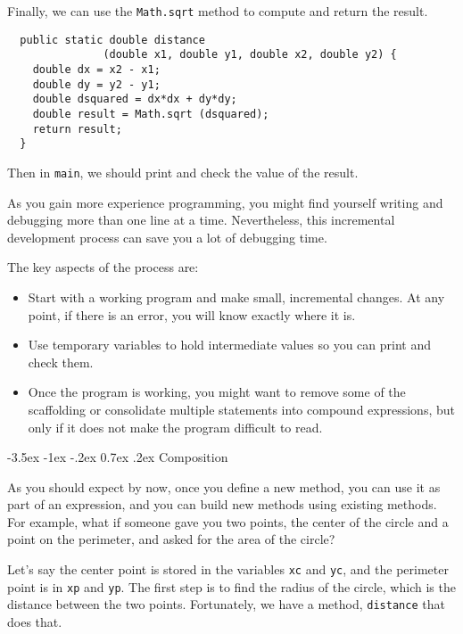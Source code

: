 \documentclass{book}
\makeatletter
\renewcommand{\section}{\@startsection 
    {section} {1} {0mm}%
    {-3.5ex \@plus -1ex \@minus -.2ex}%
    {0.7ex \@plus.2ex}%
    {\normalfont\Large\bfseries}}
\makeatother
\begin{document}
Finally, we can use the {\tt Math.sqrt} method to compute and
return the result.

\begin{verbatim}
  public static double distance
               (double x1, double y1, double x2, double y2) {
    double dx = x2 - x1;
    double dy = y2 - y1;
    double dsquared = dx*dx + dy*dy;
    double result = Math.sqrt (dsquared);
    return result;
  }
\end{verbatim}
%
Then in {\tt main}, we should print and check the value of the result.

As you gain more experience programming, you might find yourself
writing and debugging more than one line at a time.  Nevertheless,
this incremental development process can save you a lot of
debugging time.

The key aspects of the process are:

\begin{itemize}

\item Start with a working program and make small, incremental
changes.  At any point, if there is an error, you will know
exactly where it is.

\item Use temporary variables to hold intermediate values so
you can print and check them.

\item Once the program is working, you might want to remove
some of the scaffolding or consolidate multiple statements into
compound expressions, but only if it does not make the program
difficult to read.

\end{itemize}

\section{Composition}

As you should expect by now, once you define a new method,
you can use it as part of an expression, and you can build
new methods using existing methods.  For example, what if someone
gave you two points, the center of the circle and a point on
the perimeter, and asked for the area of the circle?

Let's say the center point is stored in the variables {\tt xc}
and {\tt yc}, and the perimeter point is in {\tt xp} and
{\tt yp}.  The first step is to find the radius of the circle, which
is the distance between the two points.  Fortunately, we have
a method, {\tt distance} that does that.
\end{document}
